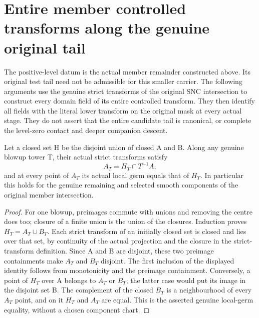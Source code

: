 \section{Entire member controlled transforms along the genuine original tail}

The positive-level datum is the actual member remainder constructed above.
Its original test tail need not be admissible for this smaller carrier.
The following arguments use the genuine strict transforms of the original SNC
intersection to construct every domain field of its entire controlled transform.
They then identify all fields with the literal lower transform on the original
mask at every actual stage. They do not assert that the entire candidate tail
is canonical, or complete the level-zero contact and deeper companion descent.

\begin{lemma}
\label{hir:member-tail-actual-clopen-strict}
\leanok
Let a closed set H be the disjoint union of closed A and B. Along any genuine
blowup tower T, their actual strict transforms satisfy
\[
 A_T=H_T\cap T^{-1}A,
\]
and at every point of $A_T$ its actual local germ equals that of $H_T$. In
particular this holds for the genuine remaining and selected smooth components
of the original member intersection.
\end{lemma}
\begin{proof}
For one blowup, preimages commute with unions and removing the centre does too;
closure of a finite union is the union of the closures. Induction proves
$H_T=A_T\cup B_T$. Each strict transform of an initially closed set is closed
and lies over that set, by continuity of the actual projection and the closure
in the strict-transform definition. Since A and B are disjoint, these two
preimage containments make $A_T$ and $B_T$ disjoint. The first inclusion of the
displayed identity follows from monotonicity and the preimage containment.
Conversely, a point of $H_T$ over A belongs to $A_T$ or $B_T$; the latter case would
put its image in the disjoint set B. The complement of the closed $B_T$ is a
neighbourhood of every $A_T$ point, and on it $H_T$ and $A_T$ are equal. This is the
asserted genuine local-germ equality, without a chosen component chart.
\end{proof}

